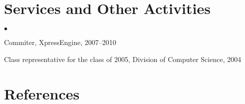 \documentclass[margin,line]{res}
\newenvironment{list1}{
  \begin{list}{\ding{113}}{%
      \setlength{\itemsep}{0in}
      \setlength{\parsep}{0in} \setlength{\parskip}{0in}
      \setlength{\topsep}{0in} \setlength{\partopsep}{0in}
      \setlength{\leftmargin}{0.17in}}}{\end{list}}
\newenvironment{list2}{
  \begin{list}{$\bullet$}{%
      \setlength{\itemsep}{0in}
      \setlength{\parsep}{0in} \setlength{\parskip}{0in}
      \setlength{\topsep}{0in} \setlength{\partopsep}{0in}
      \setlength{\leftmargin}{0.2in}}}{\end{list}}
\begin{document}
\begin{resume}
\section{\sc Services and Other Activities}
\begin{list2}
\item{Commiter, XpressEngine, 2007--2010 }
\item{Class representative for the class of 2005, Division of Computer Science, 2004}\\
\end{list2}
\section{\sc References}
\vspace{.05in}


\end{resume}
\end{document}
